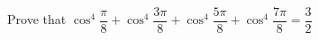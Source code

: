 
%
%
%
%
% 
% 
\question Prove that $\cos^4\dfrac{\pi}{8} + \cos^4\dfrac{3\pi}{8} + \cos^4\dfrac{5\pi}{8} + \cos^4\dfrac{7\pi}{8} = \dfrac{3}{2}$


\ifprintanswers
\fi 

